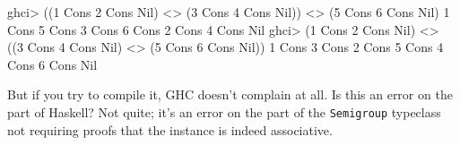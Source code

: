 \documentclass[]{article}
\newenvironment{Shaded}{}{}
\newcommand{\DataTypeTok}[1]{\textcolor[rgb]{0.56,0.13,0.00}{#1}}
\newcommand{\DecValTok}[1]{\textcolor[rgb]{0.25,0.63,0.44}{#1}}
\newcommand{\NormalTok}[1]{#1}
\newcommand{\OperatorTok}[1]{\textcolor[rgb]{0.40,0.40,0.40}{#1}}
\newcommand{\OtherTok}[1]{\textcolor[rgb]{0.00,0.44,0.13}{#1}}
\begin{document}
\begin{Shaded}
\begin{Highlighting}[]
\NormalTok{ghci}\OperatorTok{\textgreater{}}\NormalTok{ ((}\DecValTok{1} \OtherTok{\textasciigrave{}Cons\textasciigrave{}} \DecValTok{2} \OtherTok{\textasciigrave{}Cons\textasciigrave{}} \DataTypeTok{Nil}\NormalTok{) }\OperatorTok{\textless{}\textgreater{}}\NormalTok{ (}\DecValTok{3} \OtherTok{\textasciigrave{}Cons\textasciigrave{}} \DecValTok{4} \OtherTok{\textasciigrave{}Cons\textasciigrave{}} \DataTypeTok{Nil}\NormalTok{)) }\OperatorTok{\textless{}\textgreater{}}\NormalTok{ (}\DecValTok{5} \OtherTok{\textasciigrave{}Cons\textasciigrave{}} \DecValTok{6} \OtherTok{\textasciigrave{}Cons\textasciigrave{}} \DataTypeTok{Nil}\NormalTok{)}
\DecValTok{1} \OtherTok{\textasciigrave{}Cons\textasciigrave{}} \DecValTok{5} \OtherTok{\textasciigrave{}Cons\textasciigrave{}} \DecValTok{3} \OtherTok{\textasciigrave{}Cons\textasciigrave{}} \DecValTok{6} \OtherTok{\textasciigrave{}Cons\textasciigrave{}} \DecValTok{2} \OtherTok{\textasciigrave{}Cons\textasciigrave{}} \DecValTok{4} \OtherTok{\textasciigrave{}Cons\textasciigrave{}} \DataTypeTok{Nil}
\NormalTok{ghci}\OperatorTok{\textgreater{}}\NormalTok{ (}\DecValTok{1} \OtherTok{\textasciigrave{}Cons\textasciigrave{}} \DecValTok{2} \OtherTok{\textasciigrave{}Cons\textasciigrave{}} \DataTypeTok{Nil}\NormalTok{) }\OperatorTok{\textless{}\textgreater{}}\NormalTok{ ((}\DecValTok{3} \OtherTok{\textasciigrave{}Cons\textasciigrave{}} \DecValTok{4} \OtherTok{\textasciigrave{}Cons\textasciigrave{}} \DataTypeTok{Nil}\NormalTok{) }\OperatorTok{\textless{}\textgreater{}}\NormalTok{ (}\DecValTok{5} \OtherTok{\textasciigrave{}Cons\textasciigrave{}} \DecValTok{6} \OtherTok{\textasciigrave{}Cons\textasciigrave{}} \DataTypeTok{Nil}\NormalTok{))}
\DecValTok{1} \OtherTok{\textasciigrave{}Cons\textasciigrave{}} \DecValTok{3} \OtherTok{\textasciigrave{}Cons\textasciigrave{}} \DecValTok{2} \OtherTok{\textasciigrave{}Cons\textasciigrave{}} \DecValTok{5} \OtherTok{\textasciigrave{}Cons\textasciigrave{}} \DecValTok{4} \OtherTok{\textasciigrave{}Cons\textasciigrave{}} \DecValTok{6} \OtherTok{\textasciigrave{}Cons\textasciigrave{}} \DataTypeTok{Nil}
\end{Highlighting}
\end{Shaded}

But if you try to compile it, GHC doesn't complain at all. Is this an error on
the part of Haskell? Not quite; it's an error on the part of the
\texttt{Semigroup} typeclass not requiring proofs that the instance is indeed
associative.
\end{document}
